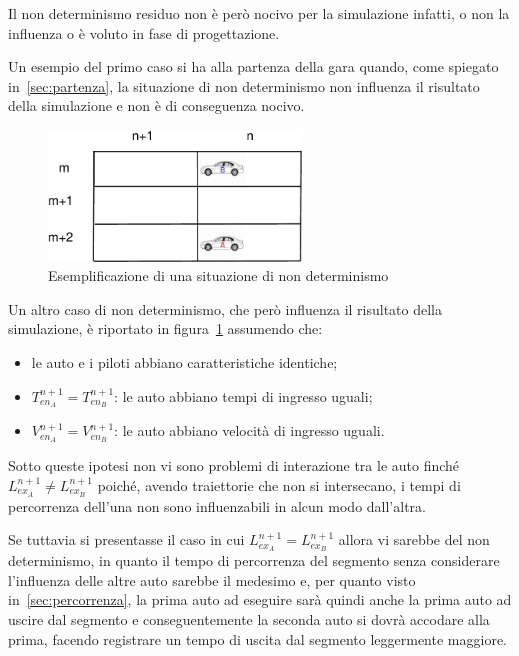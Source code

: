 Il non determinismo residuo non è però nocivo per la simulazione infatti, o non la influenza o è voluto in fase di progettazione.

Un esempio del primo caso si ha alla partenza della gara quando, come spiegato in~\ref{sec:partenza}, la situazione di non determinismo non influenza il risultato della simulazione e non è di conseguenza nocivo.

\begin{figure}
\begin{center}
\includegraphics[width=0.6\textwidth]{diagrammi/NonDet}
\caption{Esemplificazione di una situazione di non determinismo}
\label{fig:nonDet}
\end{center}
\end{figure}

Un altro caso di non determinismo, che però influenza il risultato della simulazione, è riportato in figura~\ref{fig:nonDet} assumendo che:
\begin{itemize}
\item le auto e i piloti abbiano caratteristiche identiche;
\item $T_{en_A}^{n+1} = T_{en_B}^{n+1}$: le auto abbiano tempi di ingresso uguali;
\item $V_{en_A}^{n+1} = V_{en_B}^{n+1}$: le auto abbiano velocità di ingresso uguali.
\end{itemize}

Sotto queste ipotesi non vi sono problemi di interazione tra le auto finché $L_{ex_A}^{n+1} \neq L_{ex_B}^{n+1}$ poiché, avendo traiettorie che non si intersecano, i tempi di percorrenza dell'una non sono influenzabili in alcun modo dall'altra.

Se tuttavia si presentasse il caso in cui $L_{ex_A}^{n+1} = L_{ex_B}^{n+1}$ allora vi sarebbe del non determinismo, in quanto il tempo di percorrenza del segmento senza considerare l'influenza delle altre auto sarebbe il medesimo e, per quanto visto in~\ref{sec:percorrenza}, la prima auto ad eseguire sarà quindi anche la prima auto ad uscire dal segmento e conseguentemente la seconda auto si dovrà accodare alla prima, facendo registrare un tempo di uscita dal segmento leggermente maggiore.

